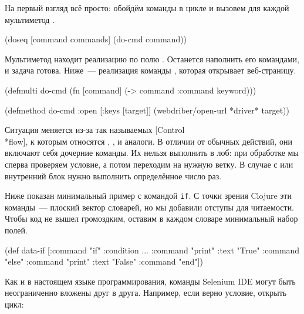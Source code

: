 На первый взгляд всё просто: обойдём команды в цикле и вызовем для каждой
мультиметод .


\begin{clojure}
(doseq [command commands]
  (do-cmd command))
\end{clojure}


Мультиметод находит реализацию по полю . Останется наполнить его
командами, и задача готова. Ниже~--- реализация команды , которая
открывает веб-страницу.

\iflarge\vspace{15mm}\pagebreak[4]\fi


\begin{clojure}
(defmulti do-cmd
  (fn [command]
    (-> command :command keyword)))

(defmethod do-cmd :open
  [{:keys [target]}]
  (webdriber/open-url *driver* target))
\end{clojure}


Ситуация меняется из-за так называемых
[Control\\*flow],
к которым относятся , ,  и аналоги. В отличии от
обычных действий, они включают себя дочерние команды. Их нельзя выполнить в лоб:
при обработке  мы сперва проверяем условие, а потом переходим на нужную
ветку. В случае с  или  внутренний блок нужно выполнить
определённое число раз.


Ниже показан минимальный пример с командой \texttt{if}. С точки зрения Clojure
эти команды~--- плоский вектор словарей, но мы добавили отступы для
читаемости. Чтобы код не вышел громоздким, оставим в каждом словаре минимальный
набор полей.


\begin{clojure}
(def data-if
  [{:command "if" :condition ...}
     {:command "print" :text "True"}
   {:command "else"}
     {:command "print" :text "False"}
   {:command "end"}])
\end{clojure}


Как и в настоящем языке программирования, команды Selenium IDE могут быть
неограниченно вложены друг в друга. Например, если верно условие, открыть цикл:


\begin{clojure}
\end{clojure}


